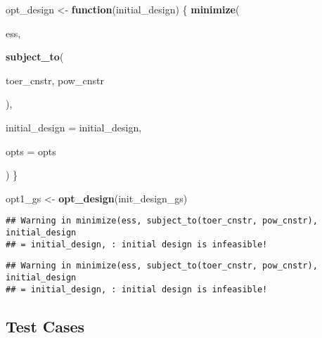 \documentclass[]{book}
\newenvironment{Shaded}{\begin{snugshade}}{\end{snugshade}}
\newcommand{\ControlFlowTok}[1]{\textcolor[rgb]{0.13,0.29,0.53}{\textbf{#1}}}
\newcommand{\DataTypeTok}[1]{\textcolor[rgb]{0.13,0.29,0.53}{#1}}
\newcommand{\DecValTok}[1]{\textcolor[rgb]{0.00,0.00,0.81}{#1}}
\newcommand{\FloatTok}[1]{\textcolor[rgb]{0.00,0.00,0.81}{#1}}
\newcommand{\KeywordTok}[1]{\textcolor[rgb]{0.13,0.29,0.53}{\textbf{#1}}}
\newcommand{\NormalTok}[1]{#1}
\newcommand{\OperatorTok}[1]{\textcolor[rgb]{0.81,0.36,0.00}{\textbf{#1}}}
\newcommand{\StringTok}[1]{\textcolor[rgb]{0.31,0.60,0.02}{#1}}
\begin{document}
\begin{Shaded}
\begin{Highlighting}[]
\NormalTok{opt_design <-}\StringTok{ }\ControlFlowTok{function}\NormalTok{(initial_design) \{}
    \KeywordTok{minimize}\NormalTok{(}
        
\NormalTok{        ess,}
        
        \KeywordTok{subject_to}\NormalTok{(}
            
\NormalTok{            toer_cnstr,}
\NormalTok{            pow_cnstr}
            
\NormalTok{        ),}
        
        \DataTypeTok{initial_design =}\NormalTok{ initial_design,}
        
        \DataTypeTok{opts =}\NormalTok{ opts}
        
\NormalTok{)}
\NormalTok{\}}

\NormalTok{opt1_gs <-}\StringTok{ }\KeywordTok{opt_design}\NormalTok{(init_design_gs)}
\end{Highlighting}
\end{Shaded}

\begin{verbatim}
## Warning in minimize(ess, subject_to(toer_cnstr, pow_cnstr), initial_design
## = initial_design, : initial design is infeasible!
\end{verbatim}

\begin{Shaded}
\end{Shaded}

\begin{verbatim}
## Warning in minimize(ess, subject_to(toer_cnstr, pow_cnstr), initial_design
## = initial_design, : initial design is infeasible!
\end{verbatim}

\hypertarget{test-cases-3}{%
\subsection{Test Cases}\label{test-cases-3}}
\end{document}
